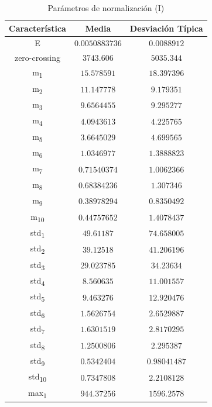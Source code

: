 \documentclass[12pt]{article}
\begin{document}
\begin{table}[!ht]
	\caption{Parámetros de normalización (I)}
	\centering
		\begin{tabular}{||c c c||}
			\hline
			Característica & Media & Desviación Típica  \\ [0.5ex]
			\hline\hline
			E & $0.0050883736$ & $0.0088912$ \\
			\hline
			zero-crossing & $3743.606$ & $5035.344$ \\
			\hline
			m\textsubscript{1} & $15.578591$ & $18.397396$ \\
			\hline
			m\textsubscript{2} & $11.147778$ & $9.179351$ \\
			\hline
			m\textsubscript{3} & $9.6564455$ & $9.295277$ \\
			\hline
			m\textsubscript{4} & $4.0943613$ & $4.225765$ \\
			\hline
			m\textsubscript{5} & $3.6645029$ & $4.699565$ \\
			\hline
			m\textsubscript{6} & $1.0346977$ & $1.3888823$ \\
			\hline
			m\textsubscript{7} & $0.71540374$ & $1.0062366$ \\
			\hline
			m\textsubscript{8} & $0.68384236$ & $1.307346$ \\
			\hline
			m\textsubscript{9} & $0.38978294$ & $0.8350492$ \\
			\hline
			m\textsubscript{10} & $0.44757652$ & $1.4078437$ \\
			\hline
			std\textsubscript{1} & $49.61187$ & $74.658005$ \\
			\hline
			std\textsubscript{2} & $39.12518$ & $41.206196$ \\
			\hline
			std\textsubscript{3} & $29.023785$ & $34.23634$ \\
			\hline
			std\textsubscript{4} & $8.560635$ & $11.001557$ \\
			\hline
			std\textsubscript{5} & $9.463276$ & $12.920476$ \\
			\hline
			std\textsubscript{6} & $1.5626754$ & $2.6529887$ \\
			\hline
			std\textsubscript{7} & $1.6301519$ & $2.8170295$ \\
			\hline
			std\textsubscript{8} & $1.2500806$ & $2.295387$ \\
			\hline
			std\textsubscript{9} & $0.5342404$ & $0.98041487$ \\
			\hline
			std\textsubscript{10} & $0.7347808$ & $2.2108128$ \\
			\hline
			max\textsubscript{1} & $944.37256$ & $1596.2578$ \\

\end{tabular}
\end{table}
\end{document}
